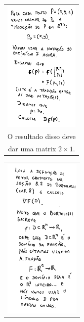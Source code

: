 \documentclass[oneside,12pt]{article}
\begin{document}
\begin{tabular}[c]{c}
%
\includegraphics[height=6.5cm]{2020-2-C3/20210430_grad_notacao_bort.pdf}
\\
O resultado disso deve \\
dar uma matrix $2×1$.
\end{tabular}
%
\qquad
%
\begin{tabular}[c]{c}
\includegraphics[height=8cm]{2020-2-C3/20210430_grad_leia_a_definicao.pdf}
\end{tabular}

\newpage

\vspace*{-1cm}
\end{document}
